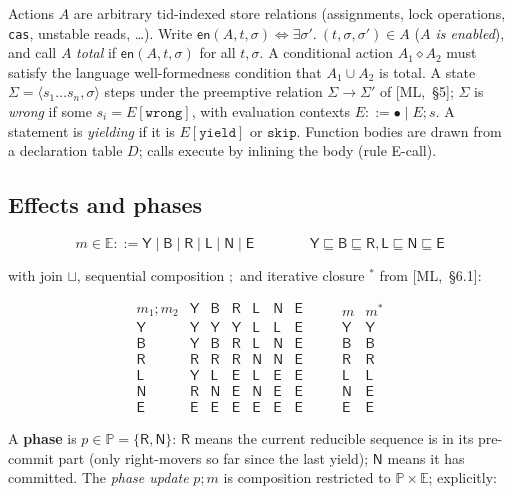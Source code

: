 \documentclass[11pt]{article}
\theoremstyle{plain}
\theoremstyle{plain}
\theoremstyle{definition}
\newcommand{\Effect}{\mathbb{E}}
\newcommand{\Phase}{\mathbb{P}}
\newcommand{\MY}{\mathsf{Y}}
\newcommand{\MB}{\mathsf{B}}
\newcommand{\MR}{\mathsf{R}}
\newcommand{\ML}{\mathsf{L}}
\newcommand{\MN}{\mathsf{N}}
\newcommand{\ME}{\mathsf{E}}
\newcommand{\sq}{\sqsubseteq}
\newcommand{\en}{\mathsf{en}}
\newcommand{\tskip}{\mathtt{skip}}
\newcommand{\twrong}{\mathtt{wrong}}
\newcommand{\tyield}{\mathtt{yield}}
\newcommand{\cact}[2]{#1\diamond #2}                 %
\newcommand{\code}[1]{\texttt{#1}}
\begin{document}
Actions $A$ are arbitrary tid-indexed store relations (assignments, lock
operations, \code{cas}, unstable reads, \dots). Write
$\en(A,t,\sigma) \iff \exists\sigma'.\ (t,\sigma,\sigma')\in A$
(\emph{$A$ is enabled}), and call $A$ \emph{total} if $\en(A,t,\sigma)$ for all
$t,\sigma$. A conditional action $\cact{A_1}{A_2}$ must satisfy the language
well-formedness condition that $A_1\cup A_2$ is total. A state
$\Sigma=\langle s_1\ldots s_n,\sigma\rangle$ steps under the preemptive relation
$\Sigma\to\Sigma'$ of [ML,~\S5]; $\Sigma$ is \emph{wrong} if some
$s_i=E[\twrong]$, with evaluation contexts $E ::= \bullet \mid E;s$. A statement
is \emph{yielding} if it is $E[\tyield]$ or $\tskip$. Function bodies are drawn
from a declaration table $D$; calls execute by inlining the body (rule E-call).

\subsection{Effects and phases}\label{sec:effects}

\[
m \in \Effect ::= \MY\mid\MB\mid\MR\mid\ML\mid\MN\mid\ME
\qquad\qquad
\MY\sq\MB\sq\MR,\ML\sq\MN\sq\ME
\]

with join $\sqcup$, sequential composition $;$ and iterative closure $^*$ from
[ML,~\S6.1]:

\[
\begin{array}{c|cccccc}
m_1;m_2 & \MY & \MB & \MR & \ML & \MN & \ME\\\hline
\MY & \MY & \MY & \MY & \ML & \ML & \ME\\
\MB & \MY & \MB & \MR & \ML & \MN & \ME\\
\MR & \MR & \MR & \MR & \MN & \MN & \ME\\
\ML & \MY & \ML & \ME & \ML & \ME & \ME\\
\MN & \MR & \MN & \ME & \MN & \ME & \ME\\
\ME & \ME & \ME & \ME & \ME & \ME & \ME
\end{array}
\qquad
\begin{array}{c|c}
m & m^{*}\\\hline
\MY & \MY\\ \MB & \MB\\ \MR & \MR\\ \ML & \ML\\ \MN & \ME\\ \ME & \ME
\end{array}
\]

A \textbf{phase} is $p\in\Phase=\{\MR,\MN\}$: $\MR$ means the current reducible
sequence is in its pre-commit part (only right-movers so far since the last
yield); $\MN$ means it has committed. The \emph{phase update} $p;m$ is composition
restricted to $\Phase\times\Effect$; explicitly:
\end{document}
